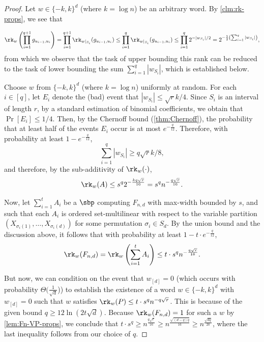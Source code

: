 \documentclass{article}
\begin{document}
\begin{proof}
Let  $w\in \{-k,k\}^d$ (where $k = \log n$) be an arbitrary word. By \autoref{clm:rk-props}, we see that 

\[
\rk_w\left(\prod_{i = 1}^{q+1} g_{u_{i-1},u_i}\right) = \prod_{i = 1}^{q+1} \rk_{w|_{S_i}}(g_{u_{i-1},u_i})
\leq \prod_{i = 1}^{q} \rk_{w|_{S_i}}(g_{u_{i-1},u_i})\leq \prod_{i = 1}^q 2^{-|w_{S_i}|/2}= 2^{-\frac12\left(\sum_{i=1}^q |w_{S_i}|\right)},
\]
from which we observe that the task of upper bounding this rank can be reduced to the task of lower bounding the sum $\sum_{i=1}^{q}|w_{S_i}|$, which is established below. 

Choose $w$ from $\{-k,k\}^d$ (where $k = \log n$) uniformly at random. For each $i\in[q]$, let $E_i$ denote the (bad) event that $|w_{S_i}|\leq  \sqrt{r}k/4$. Since $S_i$ is an interval of length $r$, by a standard estimation of binomial coefficients,  
we obtain that $\Pr[E_i]\leq 1/4$. Then,  by the Chernoff bound (\autoref{thm:Chernoff}), the probability that at least half of the events $E_i$ occur is at most $e^{-\frac{q}{12}}$. Therefore, with probability at least $1 - e^{-\frac{q}{12}}$, 
\[
\sum_{i=1}^q |w_{S_i}| \geq {q\sqrt{r}k/8},
\]
and therefore, by the sub-additivity of $\rk_w(\cdot)$,
\[
\rk_w(A) \leq s^q 2^{-\frac{kq\sqrt{r}}{16}} 
= s^q n^{-\frac{{q\sqrt{r}}}{16}}.
\]

Now, let $\sum_{i=1}^t A_i$ be a $\sbp$ computing $F_{n,d}$ with max-width bounded by $s$, and such that each $A_i$ is ordered set-multilinear with respect to the variable partition $(X_{\sigma_i(1)},\ldots, X_{\sigma_i(d)})$ for some permutation $\sigma_i\in S_d$. %
By the union bound and the discussion above, it follows that with probability at least $1-t\cdot e^{-\frac{q}{12}}$, 
\[
\rk_w(F_{n,d}) = \rk_w\left(\sum_{i=1}^t A_i\right) \leq t\cdot s^q n^{-\frac{{q\sqrt{r}}}{16}}.
\]

But now, we can condition on the event that $w_{[d]} = 0$ (which occurs with probability $\Theta(\frac{1}{\sqrt{d}}$)) to establish the existence of a word $w\in \{-k,k\}^d$ with $w_{[d]} = 0$ such that $w$ satisfies $
\rk_w(P)\leq t\cdot s^q n^{-q\sqrt{r}}$. This is because of the given bound $q\geq 12\ln(2t\sqrt{d})$. Because $\rk_w(F_{n,d}) = 1$ for such a $w$ by \autoref{lem:Fn-VP-props}, we conclude that $t\cdot s^q \geq n^{\frac{{q\sqrt{r}}}{16}} \geq n^{\frac{\sqrt{(d-q)q}}{16}}\geq n^{\frac{\sqrt{dq}}{20}}$, where the last inequality follows from our choice of $q$.
    
\end{proof}
\end{document}
